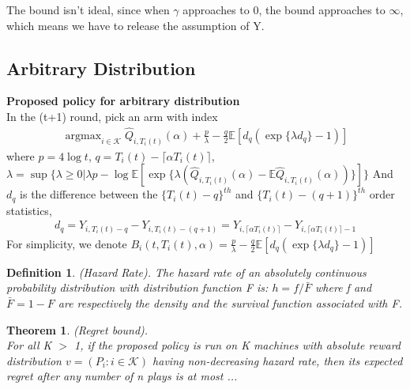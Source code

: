 \documentclass{article}
\DeclareMathOperator*{\argmax}{argmax}
\theoremstyle{plain}
\newtheorem{theo}{Theorem}
\newtheorem{defi}{Definition}
\begin{document}
The bound isn't ideal, since when $\gamma$ approaches to 0, the bound approaches to $\infty$, which means we have to release the assumption of Y. 

\subsection{Arbitrary Distribution}

\textbf{Proposed policy for arbitrary distribution}\\
In the (t+1) round, pick an arm with index 
\begin{align}
   \argmax_{i \in \mathcal{K}} \hat{Q}_{i, T_i(t)}(\alpha) + \frac{p}{\lambda} - \frac{q}{2} \mathbb{E}[d_{q} (\exp\{\lambda d_{q}\} - 1)]
\end{align}
where $p = 4 \log t$, $q = T_i(t) - \lceil \alpha T_i(t) \rceil$, $\lambda = \sup \{ \lambda \geq 0 | \lambda p - \log \mathbb{E}[\exp\{\lambda (\hat{Q}_{i, T_i(t)}(\alpha) - \mathbb{E}\hat{Q}_{i, T_i(t)}(\alpha))\}]\}$ And $d_q$ is the difference between the $\{T_i(t) - q\}^{th}$ and $\{T_i(t) - (q + 1)\}^{th}$ order statistics,
\begin{align}
    d_q = Y_{i,T_i(t) - q} - Y_{i,T_i(t) - (q + 1)} = Y_{i, \lceil \alpha T_i(t) \rceil} - Y_{i, \lceil \alpha T_i(t) \rceil - 1}
\end{align}
For simplicity, we denote $B_i(t, T_i(t), \alpha) = \frac{p}{\lambda} - \frac{q}{2} \mathbb{E}[d_{q} (\exp\{\lambda d_{q}\} - 1)]$\\

\begin{defi}
(Hazard Rate)\cite{boucheron2012}. The hazard rate of an absolutely continuous probability
distribution with distribution function F is: $h = f /\bar{F}$ where f and $\bar{F} = 1 - F$ are respectively the density and the survival function associated with F.\\
\end{defi}

\begin{theo}
(Regret bound). \\

For all K $>$ 1, if the proposed policy is run on K machines with absolute reward distribution $v = (P_i: i \in \mathcal{K})$ having non-decreasing hazard rate, then its expected regret after any number of n plays is at most ... \\
\end{theo}
\end{document}
